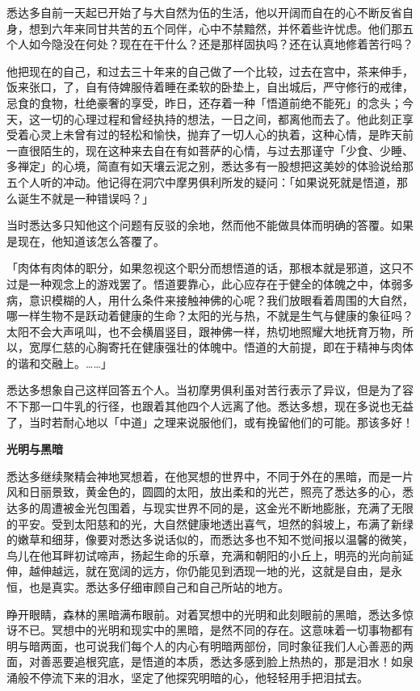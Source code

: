 \documentclass[12pt,twoside,openany]{book}
\newcommand{\mt}[1]{\textbullet \textbf{#1}}
\begin{document}
悉达多自前一天起已开始了与大自然为伍的生活，他以开阔而自在的心不断反省自身，想到六年来同甘共苦的五个同伴，心中不禁黯然，并怀着些许忧虑。他们那五个人如今隐没在何处？现在在干什么？还是那样固执吗？还在认真地修着苦行吗？

他把现在的自己，和过去三十年来的自己做了一个比较，过去在宫中，茶来伸手，饭来张口，了，自有侍婢服侍着睡在柔软的卧垫上，自出城后，严守修行的戒律，忌食的食物，杜绝豪奢的享受，昨日，还存着一种「悟道前绝不能死」的念头；今天，这一切的心理过程和曾经执持的想法，一日之间，都离他而去了。他此刻正享受着心灵上未曾有过的轻松和愉快，抛弃了一切人心的执着，这种心情，是昨天前一直很陌生的，现在这种来去自在有如菩萨的心情，与过去那谨守「少食、少睡、多禅定」的心境，简直有如天壤云泥之别，悉达多有一股想把这美妙的体验说给那五个人听的冲动。他记得在洞穴中摩男俱利所发的疑问：「如果说死就是悟道，那么诞生不就是一种错误吗？」

当时悉达多只知他这个问题有反驳的余地，然而他不能做具体而明确的答覆。如果是现在，他知道该怎么答覆了。

「肉体有肉体的职分，如果忽视这个职分而想悟道的话，那根本就是邪道，这只不过是一种观念上的游戏罢了。悟道要靠心，此心应存在于健全的体魄之中，体弱多病，意识模糊的人，用什么条件来接触神佛的心呢？我们放眼看着周围的大自然，哪一样生物不是跃动着健康的生命？太阳的光与热，不就是生气与健康的象征吗？太阳不会大声吼叫，也不会横眉竖目，跟神佛一样，热切地照耀大地抚育万物，所以，宽厚仁慈的心胸寄托在健康强壮的体魄中。悟道的大前提，即在于精神与肉体的谐和交融上。……」

悉达多想象自己这样回答五个人。当初摩男俱利虽对苦行表示了异议，但是为了容不下那一口牛乳的行径，也跟着其他四个人远离了他。悉达多想，现在多说也无益了，当时若耐心地以「中道」之理来说服他们，或有挽留他们的可能。那该多好！

\mt{光明与黑暗}

悉达多继续聚精会神地冥想着，在他冥想的世界中，不同于外在的黑暗，而是一片风和日丽景致，黄金色的，圆圆的太阳，放出柔和的光芒，照亮了悉达多的心，悉达多的周遭被金光包围着，与现实世界不同的是，这金光不断地膨胀，充满了无限的平安。受到太阳慈和的光，大自然健康地透出喜气，坦然的斜坡上，布满了新绿的嫩草和细芽，像要对悉达多说话似的，而悉达多也不知不觉间报以温馨的微笑，鸟儿在他耳畔初试啼声，扬起生命的乐章，充满和朝阳的小丘上，明亮的光向前延伸，越伸越远，就在宽阔的远方，你仍能见到洒现一地的光，这就是自由，是永恒，也是真实。悉达多仔细审顾自己和自己所站的地方。

睁开眼睛，森林的黑暗满布眼前。对着冥想中的光明和此刻眼前的黑暗，悉达多惊讶不已。冥想中的光明和现实中的黑暗，是然不同的存在。这意味着一切事物都有明与暗两面，也可说我们每个人的内心有明暗两部份，同时象征我们人心善恶的两面，对善恶要追根究底，是悟道的本质，悉达多感到脸上热热的，那是泪水！如泉涌般不停流下来的泪水，坚定了他探究明暗的心，他轻轻用手把泪拭去。
\end{document}
